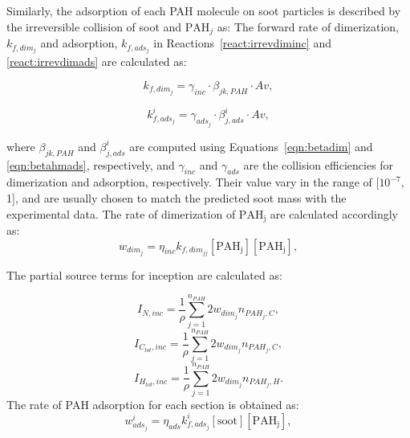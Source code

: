 Similarly, the adsorption of each PAH molecule on soot particles is described by the irreversible collision of soot and $\mathrm{PAH}_j$ as:
The forward rate of dimerization, ${k_{f,dim_j}}$ and adsorption, $k_{f,ads_j}$ in Reactions~\eqref{react:irrevdiminc} and \eqref{react:irrevdimads} are calculated as:

\begin{equation}
	k_{f,dim_j}=
	\gamma_{inc}\cdot\beta_{jk,PAH}\cdot Av
	\label{eqn:kfdim},
\end{equation}

\begin{equation}
	k^i_{f,ads_j}=
	\gamma_{ads_j}\cdot\beta^i_{j,ads}\cdot Av
	\label{eqn:kfads},
\end{equation}

\noindent where $\beta_{jk,PAH}$ and $\beta^i_{j,ads}$ are computed using Equations~\eqref{eqn:betadim} and \eqref{eqn:betahmads}, respectively, and ${\gamma_{inc}}$ and ${\gamma_{ads}}$ are the collision efficiencies for dimerization and adsorption, respectively. Their value vary in the range of [$\mathrm{10^{-7}}$, 1], and are usually chosen to match the predicted soot mass with the experimental data. The rate of dimerization of $\mathrm{PAH_j}$ are calculated accordingly as:
\begin{equation}
	w_{dim_j} = \eta_{inc} k_{f,dim_{jj}} [\mathrm{PAH_j}] [\mathrm{PAH_j}],
	\label{eqn:irrevdim_wdim}
\end{equation}

The partial source terms for inception are calculated as:

\begin{equation}
	I_{N,inc} =\frac{1}{\rho} \sum_{j=1}^{n_{PAH}} 2w_{dim_j} n_{PAH_j,C},
	\label{eqn:INinc}
\end{equation}
\begin{equation}
	I_{C_{tot},inc} = \frac{1}{\rho}\sum_{j=1}^{n_{PAH}} 2w_{dim_j} n_{PAH_j,C},
	\label{eqn:ICtotinc}
\end{equation}
\begin{equation}
	I_{H_{tot},inc} =\frac{1}{\rho} \sum_{j=1}^{n_{PAH}} 2w_{dim_j} n_{PAH_j,H}.
	\label{eqn:IHtotinc}
\end{equation}
The rate of PAH adsorption for each section is obtained as:
\begin{equation}
	w^i_{ads_j} = \eta_{ads} k^i_{f,ads_{j}} [\mathrm{soot}] [\mathrm{PAH_j}],
	\label{eqn:adsrate_irrevdim}
\end{equation}

